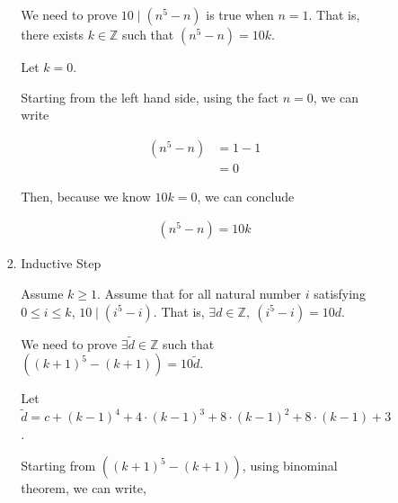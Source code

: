 \documentclass[12pt]{article}
\begin{document}
\begin{itemize}
\begin{itemize}
\begin{itemize}
\begin{mdframed}
\begin{enumerate}[1.]
\begin{mdframed}
                    \bigskip

                    We need to prove $10 \mid (n^5 - n)$ is true when $n = 1$. That is,
                    there exists $k \in \mathbb{Z}$ such that $(n^5 - n) = 10k$.

                    \bigskip

                    Let $k = 0$.

                    \bigskip

                    Starting from the left hand side, using the fact $n = 0$,
                    we can write

                    \begin{align}
                        (n^5 - n) &= 1 - 1\\
                        &= 0
                    \end{align}

                    \bigskip

                    Then, because we know $10k = 0$, we can conclude

                    \begin{align}
                        (n^5 - n) = 10k
                    \end{align}

                    \end{mdframed}

                    \item Inductive Step

                    \begin{mdframed}

                    Assume $k \geq 1$. Assume that for all natural number $i$ satisfying $0 \leq i \leq k$, $10 \mid (i^5 - i)$.
                    That is, $\exists d \in \mathbb{Z},\:(i^5 - i) = 10d$.

                    \bigskip

                    We need to prove $\exists \tilde{d} \in \mathbb{Z}$ such that
                    $((k+1)^5 - (k+1)) = 10 \tilde{d}$.

                    \bigskip

                    Let $\tilde{d} = c + (k-1)^4 + 4 \cdot (k-1)^3 + 8 \cdot (k-1)^2 +
                    8 \cdot(k-1) + 3$.

                    \bigskip

                    Starting from $((k+1)^5 - (k+1))$, using binominal theorem, we can write,


\end{mdframed}
\end{enumerate}
\end{mdframed}
\end{itemize}
\end{itemize}
\end{itemize}
\end{document}
